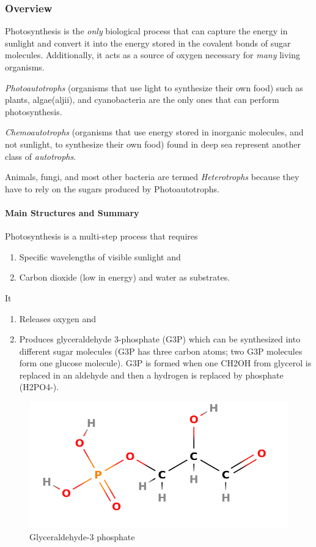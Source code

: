 \documentclass[12pt]{article}
\begin{document}
\subsubsection{Overview}
Photosynthesis is the \emph{only} biological process that can capture the energy in sunlight and convert it into the energy stored in the covalent bonds of sugar molecules. Additionally, it acts as a source of oxygen necessary for \emph{many} living organisms.

\emph{Photoautotrophs} (organisms that use light to synthesize their own food) such as plants, algae(\textmarathi{\dev aljii}), and cyanobacteria are the only ones that can perform photosynthesis.

\emph{Chemoautotrophs} (organisms that use energy stored in inorganic molecules, and not sunlight, to synthesize their own food) found in deep sea represent another class of \emph{autotrophs}.

Animals, fungi, and most other bacteria are termed \emph{Heterotrophs} because they have to rely on the sugars produced by Photoautotrophs.

\paragraph{Main Structures and Summary}
Photosynthesis is a multi-step process that requires
\begin{enumerate}
    \item Specific wavelengths of visible sunlight and
    \item Carbon dioxide (low in energy) and water as substrates.
\end{enumerate}
It 
\begin{enumerate}
    \item Releases oxygen and
    \item Produces glyceraldehyde 3-phosphate (G3P) which can be synthesized into different sugar molecules (G3P has three carbon atoms; two G3P molecules form one glucose molecule). G3P is formed when one CH2OH from glycerol is replaced in an aldehyde and then a hydrogen is replaced by phosphate (H2PO4-).
\end{enumerate}
\begin{figure}[ht!]
    \centering
    \includegraphics[width=0.8\linewidth]{g3p.png}
    \caption{Glyceraldehyde-3 phosphate}
    \label{fig: g3p}
\end{figure}
\end{document}
